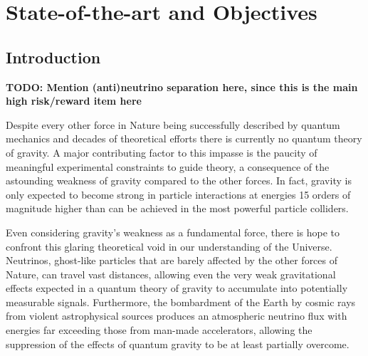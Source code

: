 \documentclass[a4paper,11pt]{article}
\newcounter{bar}
\begin{document}

\section{State-of-the-art and Objectives}
\vspace{0.1 cm}


\subsection{Introduction}

\textbf{TODO: Mention (anti)neutrino separation here, since this is the main high risk/reward item here}

Despite every other force in Nature being successfully described by quantum mechanics and decades of theoretical efforts there is currently no quantum theory of gravity. A major contributing factor to this impasse is the paucity of meaningful experimental constraints to guide theory, a consequence of the astounding weakness of gravity compared to the other forces. In fact, gravity is only expected to become strong in particle interactions at energies 15 orders of magnitude higher than can be achieved in the most powerful particle colliders.

Even considering gravity's weakness as a fundamental force, there is hope to confront this glaring theoretical void in our understanding of the Universe. Neutrinos, ghost-like particles that are barely affected by the other forces of Nature, can travel vast distances, allowing even the very weak gravitational effects expected in a quantum theory of gravity to accumulate into potentially measurable signals. Furthermore, the bombardment of the Earth by cosmic rays from violent astrophysical sources produces an atmospheric neutrino flux with energies far exceeding those from man-made accelerators, allowing the suppression of the effects of quantum gravity to be at least partially overcome.
\end{document}
